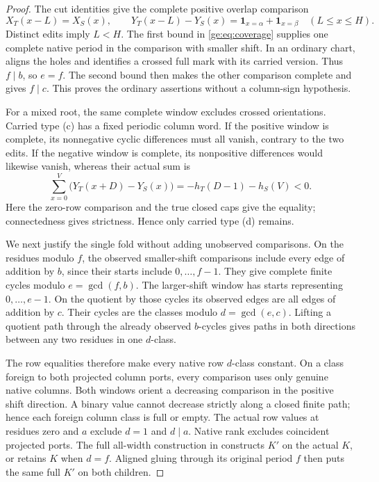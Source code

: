 \documentclass[11pt,a4paper]{amsart}
\numberwithin{equation}{section}
\theoremstyle{plain}
\theoremstyle{definition}
\newcommand{\one}{\mathbf1}
\begin{document}
\begin{proof}
The cut identities give the complete positive overlap comparison
\begin{equation}\label{ge:eq:positive-window}
 X_T(x-L)=X_S(x),\qquad
 Y_T(x-L)-Y_S(x)=\one_{x=\alpha}+\one_{x=\beta}
 \quad(L\le x\le H).
\end{equation}
Distinct edits imply \(L<H\).  The first bound in
\eqref{ge:eq:coverage} supplies one complete native period in the
comparison with smaller shift.  In an ordinary chart,
 aligns the holes and identifies a crossed full mark
with its carried version.  Thus \(f\mid b\), so \(e=f\).  The second
bound then makes the other comparison complete and gives \(f\mid c\).
This proves the ordinary assertions without a column-sign hypothesis.

For a mixed root, the same complete window excludes crossed orientations.
Carried type (c) has a fixed periodic column word.  If the positive
window is complete, its nonnegative cyclic differences must all vanish,
contrary to the two edits.  If the negative window is complete, its
nonpositive differences would likewise vanish, whereas their actual sum
is
\begin{equation}\label{ge:eq:strict-loss}
 \sum_{x=0}^{V}\bigl(Y_T(x+D)-Y_S(x)\bigr)
 =-h_T(D-1)-h_S(V)<0.
\end{equation}
Here the zero-row comparison and the true closed caps give the equality;
connectedness gives strictness.  Hence only carried type (d) remains.

We next justify the single fold without adding unobserved comparisons.
On the residues modulo \(f\), the observed smaller-shift comparisons
include every edge of addition by \(b\), since their starts include
\(0,\ldots,f-1\).  They give complete finite cycles modulo
\(e=\gcd(f,b)\).  The larger-shift window has starts representing
\(0,\ldots,e-1\).  On the quotient by those cycles its observed edges
are all edges of addition by \(c\).  Their cycles are the classes
modulo \(d=\gcd(e,c)\).  Lifting a quotient path through the already
observed \(b\)-cycles gives paths in both directions between any two
residues in one \(d\)-class.

The row equalities therefore make every native row \(d\)-class constant.
On a class foreign to both projected column ports, every comparison uses
only genuine native columns.  Both windows orient a decreasing comparison
in the positive shift direction.  A binary value cannot decrease strictly
along a closed finite path; hence each foreign column class is full or
empty.  The actual row values at residues zero and \(a\) exclude
\(d=1\) and \(d\mid a\).  Native rank excludes coincident projected
ports.  The full all-width construction in \cite[Mixed residue fold]{Shields2026Gluing} constructs
\(K'\) on the actual \(K\), or retains \(K\) when \(d=f\).
Aligned gluing through its original period \(f\) then puts the same
full \(K'\) on both children.


\end{proof}
\end{document}
